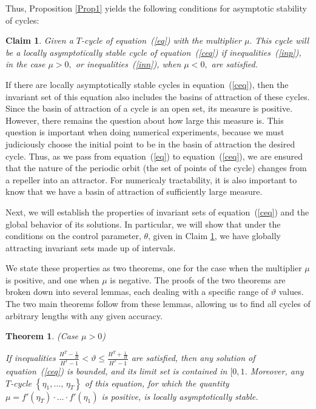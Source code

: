 \documentclass[12pt,a4paper]{amsart}
\newtheorem{theorem}{Theorem}
\newtheorem{claim}{Claim}
\begin{document}
Thus, Proposition \ref{Prop1} yields the following conditions for asymptotic stability of cycles:

\begin{claim}\label{l1}
Given a $T$-cycle of equation~(\ref{eq}) with the multiplier $\mu.$ This cycle will be a locally asymptotically stable cycle of 
equation~(\ref{ceq}) if inequalities~(\ref{inp}), in the case $\mu>0,$ or inequalities~(\ref{inn}), when $\mu<0,$ are satisfied.
\end{claim}


If there are locally asymptotically stable cycles in equation~(\ref{ceq}), then the invariant set of this equation also includes the basins of 
attraction of these cycles. Since the basin of attraction of a cycle is an open set, its measure is positive. However, there remains the question 
about how large this measure is. This question is important when doing numerical experiments, because we must  judiciously choose the initial point to be in the
 basin of attraction the desired cycle. Thus, as we pass from equation~(\ref{eq}) to equation~(\ref{ceq}), we are ensured that the nature of the periodic orbit (the set of points of the cycle) changes from a repeller into an attractor.  For numericaly tractability, it is also important 
to  know that we have a basin of attraction of sufficiently large measure.

Next, we will establish the properties of invariant sets of equation~(\ref{ceq}) and the global behavior of its solutions. In particular, we will show that under the conditions on the control parameter, $\theta$, given in Claim \ref{l1}, we have globally attracting invariant sets made up of intervals.  

We state these properties as two theorems, one for the case when the multiplier $\mu$ is positive, and one when $\mu$ is negative.  The proofs of the two theorems are broken down into several lemmas, each dealing with a specific range of $\vartheta$ values. 
The two main theorems follow from these lemmas, allowing us to find all cycles of arbitrary 
lengths with any given accuracy. 

\begin{theorem}\label{t2} ({\it Case $\mu > 0$})

If inequalities $\frac{H^T-\frac{1}{H}}{H^T-1}<\vartheta\leq\frac{H^T+\frac1H}{H^T-1}$ are satisfied, then any solution of equation~(\ref{ceq}) is bounded, and its limit set is contained in $[0,1$.  Moreover, any $T$-cycle $\left\{\eta_1,\ldots,\,\eta_T\right\}$ 
of this equation, for which the quantity $\mu = f'(\eta_T)\cdot\ldots\cdot f'(\eta_1)$ is positive, is locally asymptotically stable.
\end{theorem}
\end{document}
